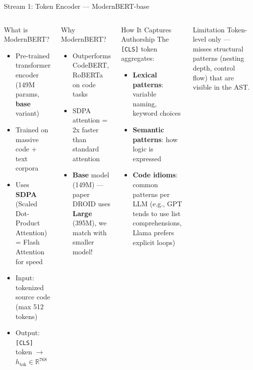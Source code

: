 \documentclass[aspectratio=169, 10pt]{beamer}
\begin{document}
\begin{frame}{Stream 1: Token Encoder --- ModernBERT-base}
\vspace{-0.15cm}
\begin{columns}[T]
\begin{block}{What is ModernBERT?}
\small
\begin{itemize}\setlength\itemsep{3pt}
    \item Pre-trained transformer encoder (149M params, \textbf{base} variant)
    \item Trained on massive code + text corpora
    \item Uses \textbf{SDPA} (Scaled Dot-Product Attention) = Flash Attention for speed
    \item Input: tokenized source code (max 512 tokens)
    \item Output: \texttt{[CLS]} token $\to$ $h_{\text{tok}} \in \mathbb{R}^{768}$
\end{itemize}
\end{block}

\begin{exampleblock}{Why ModernBERT?}
\small
\begin{itemize}\setlength\itemsep{2pt}
    \item Outperforms CodeBERT, RoBERTa on code tasks
    \item SDPA attention = 2x faster than standard attention
    \item \textbf{Base} model (149M) --- paper DROID uses \textbf{Large} (395M), we match with smaller model!
\end{itemize}
\end{exampleblock}

\begin{block}{How It Captures Authorship}
\small
The \texttt{[CLS]} token aggregates:
\begin{itemize}\setlength\itemsep{2pt}
    \item \textbf{Lexical patterns}: variable naming, keyword choices
    \item \textbf{Semantic patterns}: how logic is expressed
    \item \textbf{Code idioms}: common patterns per LLM (e.g., GPT tends to use list comprehensions, Llama prefers explicit loops)
\end{itemize}
\end{block}

\begin{alertblock}{\scriptsize Limitation}
\scriptsize
Token-level only --- misses structural patterns (nesting depth, control flow) that are visible in the AST.
\end{alertblock}
\end{columns}
\end{frame}
\end{document}
